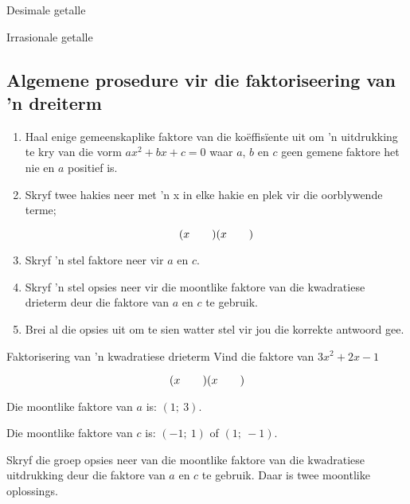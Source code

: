 \begin{Aktiwiteit}{Desimale getalle}
\begin{aktiwiteit}{Irrasionale getalle}
\subsection*{Algemene prosedure vir die faktoriseering van 'n dreiterm}

\begin{enumerate}[itemsep=5pt, label=\textbf{\arabic*}. ] 
\item Haal enige gemeenskaplike faktore van die koëffisïente uit om ’n uitdrukking te kry van die vorm $a{x}^{2}+bx+c=0$ waar $a$, $b$ en $c$ geen gemene faktore het nie en $a$ positief is.
\item Skryf twee hakies neer met ’n x in elke hakie en plek vir die oorblywende terme;

\begin{equation*}
(x\phantom{\rule{2.em}{0ex}})(x\phantom{\rule{2.em}{0ex}})
\end{equation*}

\item Skryf ’n stel faktore neer vir $a$ en $c$.
\item Skryf ’n stel opsies neer vir die moontlike faktore van die kwadratiese drieterm deur die faktore van $a$ en $c$ te gebruik.
\item Brei al die opsies uit om te sien watter stel vir jou die korrekte antwoord gee.
\end{enumerate}




\begin{wex}
{ 
Faktorisering van ’n kwadratiese drieterm
}
{
Vind die faktore van $3{x}^{2}+2x-1$ 
} 
{
\begin{equation*}
(x\phantom{\rule{2.em}{0ex}})(x\phantom{\rule{2.em}{0ex}})
\end{equation*}

Die moontlike faktore van $a$ is: $(1;~3)$.\par
Die moontlike faktore van $c$ is: $(-1;~1)$ of $(1;~-1)$.\par 
Skryf die groep opsies neer van die moontlike faktore van die kwadratiese uitdrukking deur die faktore van $a$ en $c$ te gebruik.
Daar is twee moontlike oplossings.\par 

}
\end{wex}
\end{aktiwiteit}
\end{Aktiwiteit}

